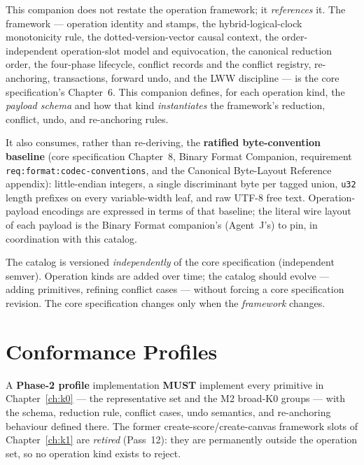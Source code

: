 \documentclass[11pt,letterpaper]{report}
\newcommand{\sectionsc}[1]{{\addfontfeatures{Letters=SmallCaps}#1}}
\newcounter{requirement}[chapter]
\newcommand{\MUST}{\textbf{MUST}}
\begin{document}
This companion does not restate the operation framework; it \emph{references} it.
The framework --- operation identity and stamps, the hybrid-logical-clock
monotonicity rule, the dotted-version-vector causal context, the
order-independent operation-slot model and equivocation, the canonical reduction
order, the four-phase lifecycle, conflict records and the conflict registry,
re-anchoring, transactions, forward undo, and the LWW discipline --- is the core
specification's Chapter~6. This companion defines, for each operation kind, the
\emph{payload schema} and how that kind \emph{instantiates} the framework's
reduction, conflict, undo, and re-anchoring rules.

It also consumes, rather than re-deriving, the \textbf{ratified byte-convention
baseline} (core specification Chapter~8, \sectionsc{Binary Format Companion},
requirement \texttt{req:format:codec-conventions}, and the
\sectionsc{Canonical Byte-Layout Reference} appendix): little-endian integers, a
single discriminant byte per tagged union, \texttt{u32} length prefixes on every
variable-width leaf, and raw UTF-8 free text. Operation-payload encodings are
expressed in terms of that baseline; the literal wire layout of each payload is
the Binary Format companion's (Agent~J's) to pin, in coordination with this
catalog.

\begin{rationale}
The catalog is versioned \emph{independently} of the core specification
(independent semver). Operation kinds are added over time; the catalog should
evolve --- adding primitives, refining conflict cases --- without forcing a core
specification revision. The core specification changes only when the
\emph{framework} changes.
\end{rationale}

\section{Conformance Profiles}

A \textbf{Phase-2 profile} implementation \MUST{} implement every primitive in
Chapter~\ref{ch:k0} --- the representative set and the M2 broad-K0 groups --- with
the schema, reduction rule, conflict cases, undo semantics, and re-anchoring
behaviour defined there. The former create-score/create-canvas framework slots
of Chapter~\ref{ch:k1} are \emph{retired} (Pass~12): they are permanently
outside the operation set, so no operation kind exists to reject.

\medskip
\end{document}
